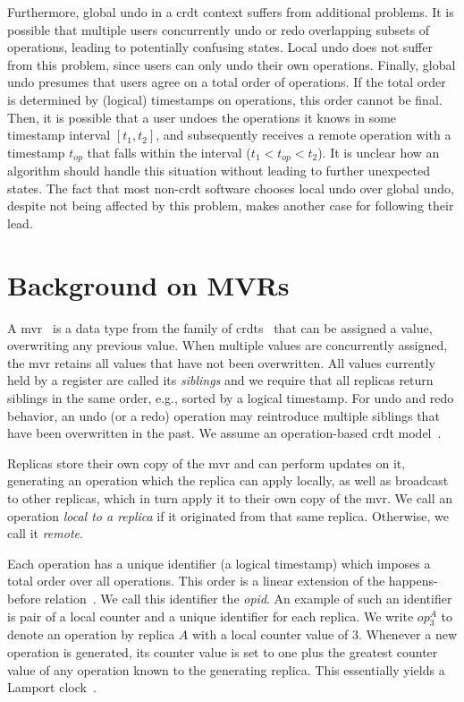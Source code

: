 \documentclass[sigplan,10pt]{acmart}
\newcommand{\op}[3][op]{$\mathit{#1}_{#2}^{#3}$} %
\begin{document}
Furthermore, global undo in a \gls{crdt} context suffers from additional problems.
It is possible that multiple users concurrently undo or redo overlapping subsets
of operations, leading to potentially confusing states.
Local undo does not suffer from this problem, since users can only undo 
their own operations.
Finally, global undo presumes that users agree on a total order of operations.
If the total order is determined by (logical) timestamps on operations,
this order cannot be final.
Then, it is possible that a user undoes the operations
it knows in some timestamp interval $[t_1, t_2]$, and subsequently receives
a remote operation with a timestamp $t_{op}$ that falls within the
interval ($t_1 < t_{op} < t_2$).
It is unclear how an algorithm should handle this situation without leading
to further unexpected states.
The fact that most non-\gls{crdt} software chooses local undo over global undo,
despite not being affected by this problem, makes another case for following their lead.

\section{Background on MVRs}\label{sec:background}

A \acrfull{mvr}~\cite{shapiro2011comprehensive} is a data type from the family
of \glspl*{crdt}~\cite{preguicca2018conflict} 
that can be assigned a value, overwriting any previous value.
When multiple values are concurrently assigned, the \gls*{mvr} retains all
values that have not been overwritten.
All values currently held by a register are called its \emph{siblings}
and we require that all replicas return siblings in the same order, e.g.,
sorted by a logical timestamp.
For undo and redo behavior, an undo (or a redo) operation
may reintroduce multiple siblings that have been overwritten in the past.
We assume an operation-based \gls*{crdt} model~\cite{baquero2017pure}.

Replicas store their own copy of the \gls{mvr} and can perform updates on it,
generating an operation which the replica can apply locally,
as well as broadcast to other replicas, which in turn apply it to their own
copy of the \gls{mvr}.
We call an operation \emph{local to a replica} if it originated from that
same replica.
Otherwise, we call it \emph{remote}.

Each operation has a unique identifier (a logical timestamp)
which imposes a total order over all operations.
This order is a linear extension of the happens-before relation~\cite{lamport1978time}.
We call this identifier the \emph{\gls*{opid}}.
An example of such an identifier is pair of a local counter and a unique identifier
for each replica.
We write \op{3}{A} to denote an operation by replica $A$
with a local counter value of $3$.
Whenever a new operation is generated, its counter value is set to one plus
the greatest counter value of any operation known to the generating replica.
This essentially yields a Lamport clock~\cite{lamport1978time}.
\end{document}
